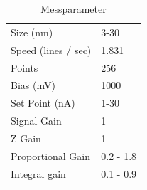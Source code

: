 \documentclass[10pt,a4paper]{article}
\begin{document}
	\begin{table}[]
		\centering
		\caption{Messparameter}
		\label{Messparameter}
		\begin{tabular}{ll}
			Size (nm)           & 3-30      \\
			Speed (lines / sec) & 1.831     \\
			Points              & 256       \\
			Bias (mV)           & 1000      \\
			Set Point (nA)      & 1-30      \\
			Signal Gain         & 1         \\
			Z Gain              & 1         \\
			Proportional Gain   & 0.2 - 1.8 \\
			Integral gain       & 0.1 - 0.9
		\end{tabular}
	\end{table}
\end{document}
